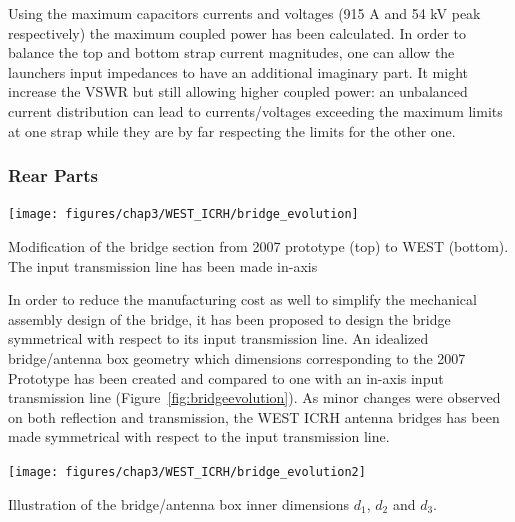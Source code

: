 {Using the maximum capacitors currents and voltages (915 A and 54 kV peak respectively) the maximum coupled power has been calculated. In order to balance the top and bottom strap current magnitudes, one can allow the launchers input impedances to have an additional imaginary part. It might increase the VSWR but still allowing higher coupled power: an unbalanced current distribution can lead to currents/voltages exceeding the maximum limits at one strap while they are by far respecting the limits for the other one. %






 

\subsubsection{Rear Parts}
\begin{marginfigure}
	\centering
	\texttt{[image: figures/chap3/WEST\_ICRH/bridge\_evolution]}
	\caption{Modification of the bridge section from 2007 prototype (top) to WEST (bottom). The input transmission line has been made in-axis}
	\label{fig:bridgeevolution}
\end{marginfigure}

In order to reduce the manufacturing cost as well to simplify the mechanical assembly design of the bridge, it has been proposed to design the bridge symmetrical with respect to its input transmission line. An idealized bridge/antenna box geometry which dimensions corresponding to the 2007 Prototype has been created and compared to one with an in-axis input transmission line (Figure~\ref{fig:bridgeevolution}). As minor changes were observed on both reflection and transmission, the WEST ICRH antenna bridges has been made symmetrical with respect to the input transmission line.

\begin{marginfigure}
	\centering
	\texttt{[image: figures/chap3/WEST\_ICRH/bridge\_evolution2]}
	\caption{Illustration of the bridge/antenna box inner dimensions $d_1$, $d_2$ and $d_3$.}
	\label{fig:bridgeevolution2}
\end{marginfigure}

}
